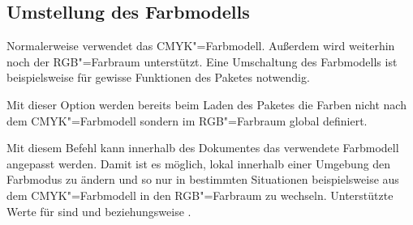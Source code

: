 \begin{Declaration*}{}
\subsection{Umstellung des Farbmodells}
%
Normalerweise verwendet  das CMYK"=Farbmodell. Außerdem 
wird weiterhin noch der RGB"=Farbraum unterstützt. Eine Umschaltung des 
Farbmodells ist beispielsweise für gewisse Funktionen des Paketes 
 notwendig.

\begin{Declaration}{}
\printdeclarationlist%
%
Mit dieser Option werden bereits beim Laden des Paketes  
die Farben nicht nach dem CMYK"=Farbmodell sondern im RGB"=Farbraum global 
definiert.
\end{Declaration}

\begin{Declaration}{}
\printdeclarationlist%
%
Mit diesem Befehl kann innerhalb des Dokumentes das verwendete Farbmodell 
angepasst werden. Damit ist es möglich, lokal innerhalb einer Umgebung den 
Farbmodus zu ändern und so nur in bestimmten Situationen beispielsweise aus dem 
CMYK"=Farbmodell in den RGB"=Farbraum zu wechseln. Unterstützte Werte für 
 sind  und  beziehungsweise 
.
\end{Declaration}

\bigskip\noindent
{}
\end{Declaration*}



